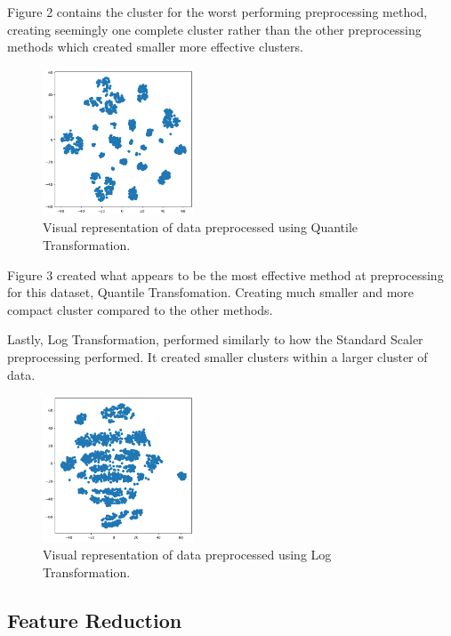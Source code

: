 \documentclass[twocolumn]{article}
\begin{document}
Figure 2 contains the cluster for the worst performing preprocessing method, creating seemingly one complete cluster rather than the other preprocessing methods which created smaller more effective clusters.

\begin{figure}[H]
    \centering
    \includegraphics[width=0.4\textwidth]{images/quantile_transform.png}
    \caption{Visual representation of data preprocessed using Quantile Transformation.}
\end{figure}

Figure 3 created what appears to be the most effective method at preprocessing for this dataset, Quantile Transfomation. Creating much smaller and more compact cluster compared to the other methods.

Lastly, Log Transformation, performed similarly to how the Standard Scaler preprocessing performed. It created smaller clusters within a larger cluster of data. 

\begin{figure}[H]
    \centering
    \includegraphics[width=0.4\textwidth]{images/log_transformed.png}
    \caption{Visual representation of data preprocessed using Log Transformation.}
\end{figure}


\subsection{Feature Reduction}
\end{document}
